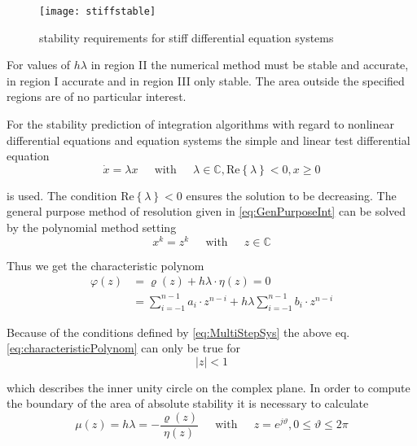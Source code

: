 \begin{figure}[ht]
\begin{center}
\texttt{[image: stiffstable]}
\end{center}
\caption{stability requirements for stiff differential equation systems}
\label{fig:StiffStable}
\end{figure}
\FloatBarrier

For values of $h\lambda$ in region II the numerical method must be
stable and accurate, in region I accurate and in region III only
stable.  The area outside the specified regions are of no particular
interest.

\addvspace{12pt}

For the stability prediction of integration algorithms with regard to
nonlinear differential equations and equation systems the simple and
linear test differential equation
\begin{equation}
\dot{x} = \lambda x
\;\;\;\; \textrm{ with } \;\;\;\;
\lambda \in \mathbb{C}, \text{Re}\left\{\lambda\right\} < 0, x \ge 0
\end{equation}

is used.  The condition $\text{Re}\left\{\lambda\right\} < 0$ ensures
the solution to be decreasing.  The general purpose method of
resolution given in \eqref{eq:GenPurposeInt} can be solved by the
polynomial method setting
\begin{equation}
x^k = z^k
\;\;\;\; \textrm{ with } \;\;\;\;
z \in \mathbb{C}
\end{equation}

Thus we get the characteristic polynom
\begin{align}
\label{eq:characteristicPolynom}
\varphi\left(z\right) &= \varrho\left(z\right) + h\lambda \cdot \eta\left(z\right) = 0\\
&= \sum^{n-1}_{i=-1} a_i\cdot z^{n-i} + h\lambda \sum^{n-1}_{i=-1} b_i\cdot z^{n-i}
\end{align}

Because of the conditions defined by \eqref{eq:MultiStepSys} the above
eq. \eqref{eq:characteristicPolynom} can only be true for
\begin{equation}
\left|z\right| < 1
\end{equation}

which describes the inner unity circle on the complex plane.  In order
to compute the boundary of the area of absolute stability it is
necessary to calculate
\begin{equation}
\label{eq:StabArea}
\mu\left(z\right) = h\lambda = -\dfrac{\varrho\left(z\right)}{\eta\left(z\right)}
\;\;\;\; \textrm{ with } \;\;\;\;
z = e^{j\vartheta}, 0 \le \vartheta \le 2\pi
\end{equation}

